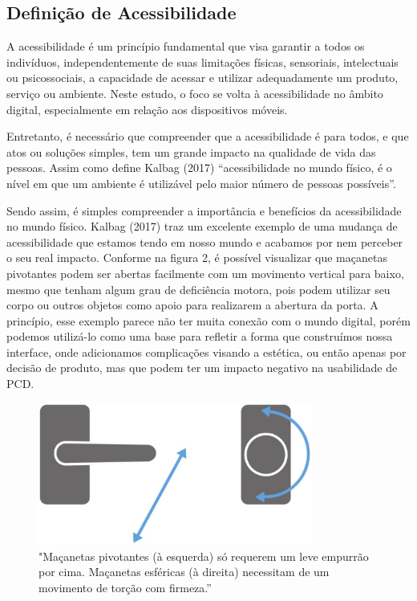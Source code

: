 \subsection{Definição de Acessibilidade}

A acessibilidade é um princípio fundamental que visa garantir a todos os indivíduos, independentemente de suas limitações físicas, sensoriais, intelectuais ou psicossociais, a capacidade de acessar e utilizar adequadamente um produto, serviço ou ambiente. Neste estudo, o foco se volta à acessibilidade no âmbito digital, especialmente em relação aos dispositivos móveis.

Entretanto, é necessário que compreender que a acessibilidade é para todos, e que atos ou soluções simples, tem um grande impacto na qualidade de vida das pessoas. Assim como define Kalbag (2017) “acessibilidade no mundo físico, é o nível em que um ambiente é utilizável pelo maior número de pessoas possíveis”.

Sendo assim, é simples compreender a importância e benefícios da acessibilidade no mundo físico. Kalbag (2017) traz um excelente exemplo de uma mudança de acessibilidade que estamos tendo em nosso mundo e acabamos por nem perceber o seu real impacto. Conforme na figura 2, é possível visualizar que maçanetas pivotantes podem ser abertas facilmente com um movimento vertical para baixo, mesmo que tenham algum grau de deficiência motora, pois podem utilizar seu corpo ou outros objetos como apoio para realizarem a abertura da porta. A princípio, esse exemplo parece não ter muita conexão com o mundo digital, porém podemos utilizá-lo como uma base para refletir a forma que construímos nossa interface, onde adicionamos complicações visando a estética, ou então apenas por decisão de produto, mas que podem ter um impacto negativo na usabilidade de PCD.

\begin{figure}[!h]
	\centering
	\caption{"Maçanetas pivotantes (à esquerda) só requerem um leve empurrão por cima. Maçanetas esféricas (à direita) necessitam de um movimento de torção com firmeza.”}
	\includegraphics[width=256pt]{Assets/Macanetas pivotantes.png}
\end{figure}

